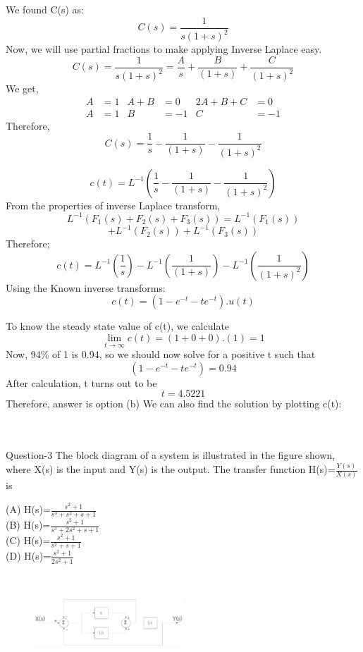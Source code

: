 \documentclass[journal,12pt,twocolumn]{IEEEtran}
\begin{document}
We found C(s) as:
$$C(s) =  \frac{1}{s(1+s)^2}$$
Now, we will use partial fractions to make applying Inverse Laplace easy.
$$C(s) =  \frac{1}{s(1+s)^2} =  \frac{A}{s} + \frac{B}{(1+s)} + \frac{C}{(1+s)^2}$$
We get, 
\begin{align*}
A &= 1 & A+B &=0 & 2A+B+C &= 0 \\
A &=1 & B &=-1 & C &=-1
\end{align*}
Therefore,
$$C(s) = \frac{1}{s} - \frac{1}{(1+s)} - \frac{1}{(1+s)^2}$$

$$c(t) = L^{-1} ( \frac{1}{s} - \frac{1}{(1+s)} - \frac{1}{(1+s)^2}) $$
From the properties of inverse Laplace transform,
$$L^{-1} (F_1(s) + F_2(s) + F_3(s)) = L^{-1}(F_1(s)) $$ 
$$ + L^{-1}(F_2(s)) + L^{-1}(F_3(s))$$
Therefore;
$$c(t) = L^{-1} ( \frac{1}{s}) - L^{-1}(\frac{1}{(1+s)}) - L^{-1}(\frac{1}{(1+s)^2}) $$
Using the Known inverse transforms:
$$c(t) = (1 - e^{-t} - te^{-t}) . u(t)$$

To know the steady state value of c(t), we calculate 
$$\lim_{t\to\infty} c(t) = (1+0+0).(1) = 1$$
Now, 94\% of 1 is 0.94, so we should now solve for a positive t such that
$$(1 - e^{-t} - te^{-t}) = 0.94$$
After calculation, t turns out to be
$$ t = 4.5221$$
Therefore, answer is option (b)
We can also find the solution by plotting c(t):
\\\\\

\begin{frame}{Question-3 }
The block diagram of a system is illustrated in the figure shown, where X(s) is the input and Y(s) is the output. The transfer function H(s)=$\frac{Y(s)}{X(s)}$ is 

(A) H(s)=$\frac{s^2+1}{s^3+s^2+s+1}$ \\
(B) H(s)=$\frac{s^2+1}{s^3+2s^2+s+1}$ \\
(C) H(s)=$\frac{s^2+1}{s^2+s+1}$ \\
(D) H(s)=$\frac{s^2+1}{2s^2+1}$
\end{frame}\\
\begin{figure}[h]
\includegraphics[width=0.5\textwidth]{./figs/pic1.eps}
\end{figure}
\end{document}
